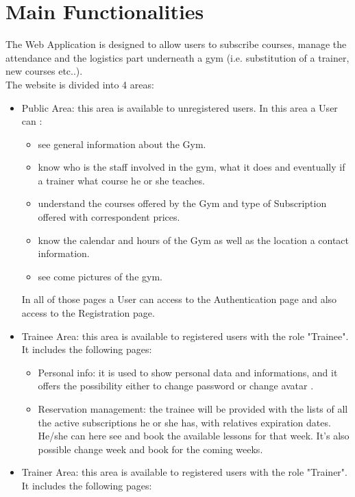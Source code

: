 \section{Main Functionalities}

The Web Application is designed to allow users to subscribe courses, manage the attendance and the logistics part underneath a gym (i.e. substitution of a trainer, new courses etc..).\\
The website is divided into 4 areas:

\begin{itemize}
	\item Public Area: this area is available to unregistered users. In this area a User can :
	\begin{itemize}
		\item see general information about the Gym.
		\item know who is the staff involved in the gym, what it does and eventually if a trainer what course he or she teaches.
		\item understand the courses offered by the Gym and type of Subscription offered with correspondent prices.
		\item know the calendar and hours of the Gym as well as the location a contact information.
		\item see come pictures of the gym.
	\end{itemize}	 
	In all of those pages a User can access to the Authentication page and also access to the Registration page. 
	\item Trainee Area: this area is available to registered users with the role "Trainee". It includes the following pages:
	\begin{itemize}
		\item Personal info: it is used to show personal data and informations, and it offers the possibility either to change password or change avatar .
		\item Reservation management: the trainee will be provided with the lists of all the active subscriptions he or she has, with relatives expiration dates. He/she can here see and book the available lessons for that week. It's also possible change week and book for the coming weeks.
	\end{itemize}
	\item Trainer Area: this area is available to registered users with the role "Trainer". It includes the following pages:

\end{itemize}
